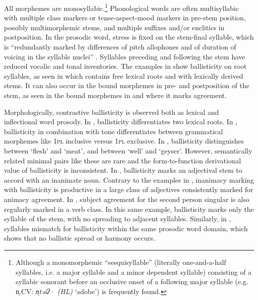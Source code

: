 \documentclass[output=paper]{langscibook}
\begin{document}
All morphemes are monosyllabic.\footnote{Although
     a monomorphemic “sesquisyllable” (literally one-and-a-half syllables, i.e. a major syllable and a minor dependent syllable) consisting of a syllabic sonorant before an occlusive onset of a following major syllable (e.g. n̩.CV: \textit{n̩təĩʔ}· \textit{(HL)} ‘adobe’) is frequently found.}
Phonological words are often multisyllabic with multiple class markers or tense-aspect-mood markers in pre-stem position, possibly multimorphemic stems, and multiple suffixes and/or enclitics in postposition. In the prosodic word, stress is fixed on the stem-final syllable, which is “redundantly marked by differences of pitch allophones and of duration of voicing in the syllable nuclei” \citep[472]{Bauernschmidt1965}. Syllables preceding and following the stem have reduced vocalic and tonal inventories. The examples in  show ballisticity on root syllables, as seen in
which contains free lexical roots and
with lexically derived stems. It can also occur in the bound morphemes in pre- and postposition of the stem, as seen in the bound morphemes in
and
where it marks agreement.

Morphologically, contrastive ballisticity is observed both as lexical and inflectional word prosody.
In
, ballisticity differentiates two lexical roots.
In
, ballisticity in combination with tone differentiates between grammatical morphemes like 1\textsc{pl} inclusive versus 1\textsc{pl} exclusive.
In
, ballisticity distinguishes between ‘flesh’ and ‘meat’, and between ‘well’ and ‘geyser’. However, semantically related minimal pairs like these are rare and the form-to-function derivational value of ballisticity is inconsistent.
In
, ballisticity marks an adjectival stem to accord with an inanimate noun. Contrary to the examples
in
, inanimacy marking with ballisticity is productive in a large class of adjectives consistently marked for animacy agreement.
In
, subject agreement for the second person singular is also regularly marked in a verb class. In this same example, ballisticity marks only the syllable of the stem, with no spreading to adjacent syllables. Similarly,
in
, syllables mismatch for ballisticity within the same prosodic word domain, which shows that no ballistic spread or harmony occurs.
\end{document}

